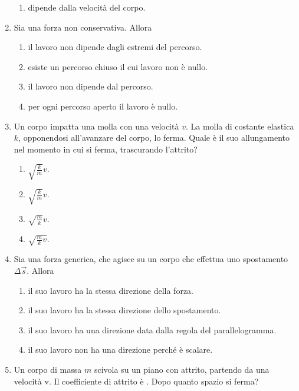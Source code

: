 \documentclass{article}
\begin{document}
\begin{enumerate}
\begin{enumerate}[label=\Alph*.]
    \item dipende dalla velocità del corpo.
  \end{enumerate}
  \item Sia  una forza non conservativa. Allora
  \begin{enumerate}[label=\Alph*.]
    \item il lavoro non dipende dagli estremi del percorso.
    \item esiste un percorso chiuso il cui lavoro non è nullo.
    \item il lavoro non dipende dal percorso.
    \item per ogni percorso aperto il lavoro è nullo.
  \end{enumerate}
  \item Un corpo impatta una molla con una velocità $v$. La molla di costante elastica $k$, opponendosi all'avanzare del corpo, lo ferma. Quale è il suo allungamento nel momento in cui si ferma, trascurando l'attrito?
  \begin{enumerate}[label=\Alph*.]
    \item $\sqrt{\frac{k}{m}}v$.
    \item $\sqrt{\frac{k}{m}}v$.
    \item $\sqrt{\frac{m}{k}}v$.
    \item $\sqrt{\frac{m}{k}v}$.
  \end{enumerate}
  \item Sia  una forza generica, che agisce su un corpo che effettua uno spostamento $\Delta \vec{s}$. Allora
  \begin{enumerate}[label=\Alph*.]
    \item il suo lavoro ha la stessa direzione della forza.
    \item il suo lavoro ha la stessa direzione dello spostamento.
    \item il suo lavoro ha una direzione data dalla regola del parallelogramma.
    \item il suo lavoro non ha una direzione perché è scalare.
  \end{enumerate}
  \item Un corpo di massa $m$ scivola su un piano con attrito, partendo da una velocità v. Il coefficiente di attrito è \mu. Dopo quanto spazio si ferma?
  \begin{enumerate}[label=\Alph*.]
    \item $\frac{1}{2}v^2-\mu g$.
    \item $\frac{2v^2}{g\mu}}$.
    \item $\frac{1}{2}v^2+\mu g$.

\end{enumerate}
\end{enumerate}
\end{document}
